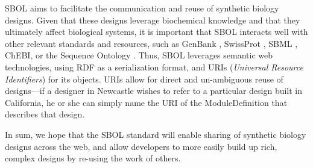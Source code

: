 
SBOL aims to facilitate the communication and reuse of synthetic biology designs. Given that these designs leverage biochemical knowledge and that they ultimately affect biological systems, it is important that SBOL interacts well with other relevant standards and resources, such as GenBank \cite{genbank}, SwissProt \cite{swissprot}, SBML \cite{SBML}, ChEBI\cite{chebi}, or the Sequence Ontology \cite{so}. Thus, SBOL leverages semantic web technologies, using RDF as a serialization format, and URIs (\emph{Universal Resource Identifiers}) for its objects. URIs allow for direct and un-ambiguous reuse of designs---if a designer in Newcastle wishes to refer to a particular design built in California, he or she can simply name the URI of the ModuleDefinition that describes that design. 

In sum, we hope that the SBOL standard will enable sharing of synthetic biology designs across the web, and allow developers to more easily build up rich, complex designs by re-using the work of others. 







